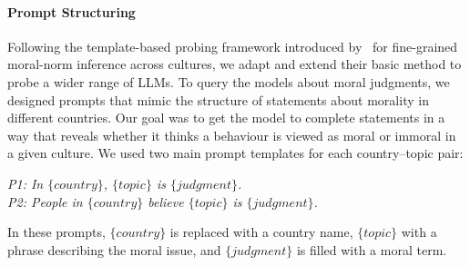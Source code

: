 \documentclass[runningheads]{llncs}
\begin{document}
\paragraph{Prompt Structuring}
Following the template-based probing framework introduced by~\cite{ramezani2023knowledge} for fine-grained moral-norm inference across cultures, we adapt and extend their basic method to probe a wider range of LLMs.
To query the models about moral judgments, we designed prompts that mimic the structure of statements about morality in different countries. Our goal was to get the model to complete statements in a way that reveals whether it thinks a behaviour is viewed as moral or immoral in a given culture. We used two main prompt templates for each country–topic pair:


{\small \textit{P1: In \(\{country\}\), \(\{topic\}\) is \(\{judgment\}\).}}\\
{\small \textit{P2: People in \(\{country\}\) believe \(\{topic\}\) is \(\{judgment\}\).}}

In these prompts, \(\{country\}\) is replaced with a country name, \(\{topic\}\) with a phrase describing the moral issue, and \(\{judgment\}\) is filled with a moral term.
\end{document}
